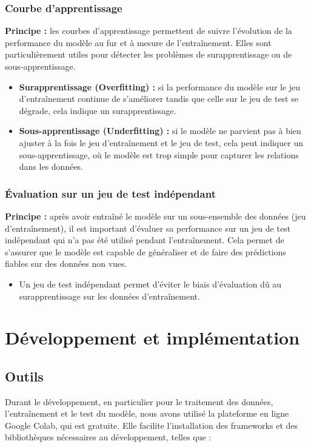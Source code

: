 \subsubsection{Courbe d'apprentissage}
\textbf{Principe :} les courbes d'apprentissage permettent de suivre l'évolution de la performance du modèle au fur et à mesure de l'entraînement. Elles sont particulièrement utiles pour détecter les problèmes de surapprentissage ou de sous-apprentissage.
\begin{itemize}
	\item \textbf{Surapprentissage (Overfitting) :} si la performance du modèle sur le jeu d'entraînement continue de s'améliorer tandis que celle sur le jeu de test se dégrade, cela indique un surapprentissage.
	\item \textbf{Sous-apprentissage (Underfitting) :} si le modèle ne parvient pas à bien ajuster à la fois le jeu d'entraînement et le jeu de test, cela peut indiquer un sous-apprentissage, où le modèle est trop simple pour capturer les relations dans les données.
\end{itemize}

\subsubsection{Évaluation sur un jeu de test indépendant}
\textbf{Principe :} après avoir entraîné le modèle sur un sous-ensemble des données (jeu d'entraînement), il est important d'évaluer sa performance sur un jeu de test indépendant qui n'a pas été utilisé pendant l'entraînement. Cela permet de s'assurer que le modèle est capable de généraliser et de faire des prédictions fiables sur des données non vues.
\begin{itemize}
	\item Un jeu de test indépendant permet d'éviter le biais d'évaluation dû au surapprentissage sur les données d'entraînement.
\end{itemize}


\section{Développement et implémentation}
 \subsection{Outils} Durant le développement, en particulier pour le traitement des données, l'entraînement et le test du modèle, nous avons utilisé la plateforme en ligne Google Colab, qui est gratuite. Elle facilite l'installation des frameworks et des bibliothèques nécessaires au développement, telles que :

